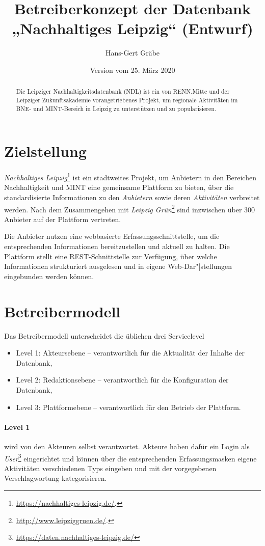 \documentclass[a4paper,11pt]{article}
\title{Betreiberkonzept der Datenbank\\ „Nachhaltiges Leipzig“ (Entwurf)}
\author{Hans-Gert Gräbe}
\date{Version vom 25. März 2020}
\begin{document}
\maketitle
\begin{abstract}
  Die Leipziger Nachhaltigkeitsdatenbank (NDL) ist ein von RENN.Mitte und der
  Leipziger Zukunftsakademie vorangetriebenes Projekt, um regionale
  Aktivitäten im BNE- und MINT-Bereich in Leipzig zu unterstützen und zu
  popularisieren.
\end{abstract}
\tableofcontents 
\newpage

\section{Zielstellung}

\emph{Nachhaltiges Leipzig}\footnote{\url{https://nachhaltiges-leipzig.de/}.}
ist ein stadtweites Projekt, um Anbietern in den Bereichen Nachhaltigkeit und
MINT eine gemeinsame Plattform zu bieten, über die standardisierte
Informationen zu den \emph{Anbietern} sowie deren \emph{Aktivitäten}
verbreitet werden.  Nach dem Zusammengehen mit \emph{Leipzig
  Grün}\footnote{\url{http://www.leipziggruen.de/}.} sind inzwischen über 300
Anbieter auf der Plattform vertreten. 

Die Anbieter nutzen eine webbasierte Erfassungsschnittstelle, um die
entsprechenden Informationen bereitzustellen und aktuell zu halten.  Die
Plattform stellt eine REST-Schnittstelle zur Verfügung, über welche
Informationen strukturiert ausgelesen und in eigene Web-Dar"|stellungen
eingebunden werden können.

\section{Betreibermodell}

Das Betreibermodell unterscheidet die üblichen drei Servicelevel
\begin{itemize}
\item Level 1: Akteursebene -- verantwortlich für die Aktualität der Inhalte
  der Datenbank,
\item Level 2: Redaktionsebene -- verantwortlich für die Konfiguration der
  Datenbank,
\item Level 3: Plattformebene -- verantwortlich für den Betrieb der
  Plattform. 
\end{itemize}
\paragraph{Level 1}
wird von den Akteuren selbst verantwortet. Akteure haben dafür ein Login als
\emph{User}\footnote{\url{https://daten.nachhaltiges-leipzig.de/}}
eingerichtet und können über die entsprechenden Erfassungsmasken eigene
Aktivitäten verschiedenen Typs eingeben und mit der vorgegebenen
Verschlagwortung kategorisieren.
\end{document}
